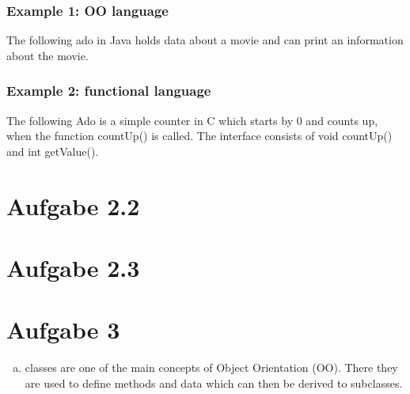 \documentclass[a4paper,10pt]{scrartcl}[2003/01/01]
\begin{document}
	\subsubsection*{Example 1: OO language}
	The following ado in Java holds data about a movie and can print an information about the movie. 
	
	
	\subsubsection*{Example 2: functional language}
	The following Ado is a simple counter in C which starts by 0 and counts up, when the function countUp() is called. The interface consists of void countUp() and int getValue().
	
	
	
	\section*{Aufgabe 2.2}
	
	\section*{Aufgabe 2.3}
	
	\section{Aufgabe 3}
	\begin{enumerate}[a)]
		\item classes are one of the main concepts of Object Orientation (OO). There they are used to define methods and data which can then be derived to subclasses.
		
	\end{enumerate}
	
\end{document}
